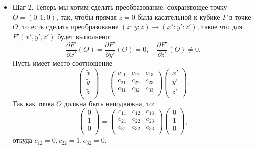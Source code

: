 \begin{itemize}[leftmargin=0.6cm]
    \item Шаг 2. Теперь мы хотим сделать преобразование,
    сохраняющее точку \(O = (0 : 1 : 0)\), так, чтобы
    прямая \(z = 0\) была касательной к кубике \(\widetilde{F}\) в точке
    \(O\), то есть сделать преобразование \((\widetilde{x} :
    \widetilde{y} : \widetilde{z}) \to (x' : y' : z')\), такое что
    для \(F'(x', y', z')\) будет выполнено: 
     \[
    \frac{\partial F'}{\partial x'} (O) = \frac{\partial F'}{\partial y'}
    (O) = 0, \quad \frac{\partial F'}{\partial z'} (O) \ne 0
    .\]
    Пусть имеет место соотношение
    \[
    \begin{pmatrix}
        \widetilde{x} \\
        \widetilde{y} \\
        \widetilde{z} \\
    \end{pmatrix} 
    = 
    \begin{pmatrix}
        c_{11} & c_{12} & c_{13} \\
        c_{21} & c_{22} & c_{23} \\
        c_{31} & c_{32} & c_{33} \\
    \end{pmatrix}
    \begin{pmatrix}
        x' \\
        y' \\
        z' \\
    \end{pmatrix}
    .\] 
    Так как точка \(O\) должна быть неподвижна, то:
    \[
    \begin{pmatrix}
        0 \\
        1 \\
        0 \\
    \end{pmatrix}
    = 
    \begin{pmatrix}
        c_{11} & c_{12} & c_{13} \\
        c_{21} & c_{22} & c_{23} \\
        c_{31} & c_{32} & c_{33} \\
    \end{pmatrix}
    \begin{pmatrix}
        0 \\
        1 \\
        0 \\
    \end{pmatrix}
    ,\] 
    откуда \(c_{12} = 0, c_{22} = 1, c_{32} = 0\). 
        

\end{itemize}
